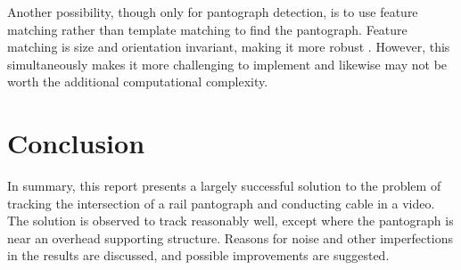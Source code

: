 Another possibility, though only for pantograph detection, is to use feature matching rather than template matching to find the pantograph. Feature matching is size and orientation invariant, making it more robust \cite{opencv_fm}. However, this simultaneously makes it more challenging to implement and likewise may not be worth the additional computational complexity.

\section{Conclusion}

In summary, this report presents a largely successful solution to the problem of tracking the intersection of a rail pantograph and conducting cable in a video. The solution is observed to track reasonably well, except where the pantograph is near an overhead supporting structure. Reasons for noise and other imperfections in the results are discussed, and possible improvements are suggested.

